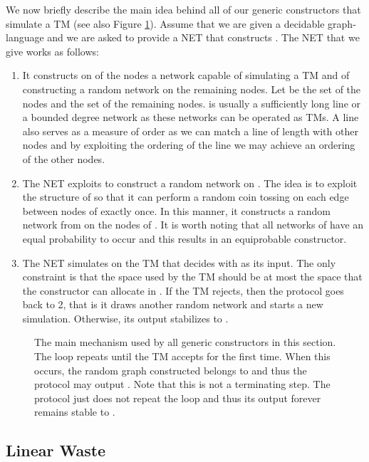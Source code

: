 \documentclass[oribibl, 11pt]{llncs}
\begin{document}
We now briefly describe the main idea behind all of our generic constructors that simulate a TM (see also Figure \ref{fig:main-loop}). Assume that we are given a decidable graph-language  and we are asked to provide a NET that constructs . The NET that we give works as follows:

\begin{enumerate}
 \item It constructs on  of the nodes a network  capable of simulating a TM and of constructing a random network on the remaining  nodes. Let  be the set of the  nodes and  the set of the remaining  nodes.  is usually a sufficiently long line or a bounded degree network as these networks can be operated as TMs. A line also serves as a measure of order as we can match a line of length  with  other nodes and by exploiting the ordering of the line we may achieve an ordering of the other nodes. 
 \item The NET exploits  to construct a random network on . The idea is to exploit the structure of  so that it can perform a random coin tossing on each edge between nodes of  exactly once. In this manner, it constructs a random network  from  on the nodes of . It is worth noting that all networks of  have an equal probability to occur and this results in an equiprobable constructor.
 \item The NET simulates on  the TM that decides  with  as its input. The only constraint is that the space used by the TM should be at most the space that the constructor can allocate in . If the TM rejects, then the protocol goes back to 2, that is it draws another random network and starts a new simulation. Otherwise, its output stabilizes to .
\end{enumerate}


\begin{figure}[!hbtp]
\caption{The main mechanism used by all generic constructors in this section. The loop repeats until the TM accepts for the first time. When this occurs, the random graph  constructed belongs to  and thus the protocol may output . Note that this is not a terminating step. The protocol just does not repeat the loop and thus its output forever remains stable to .} \label{fig:main-loop}
\end{figure} 

\subsection{Linear Waste} 
\end{document}
